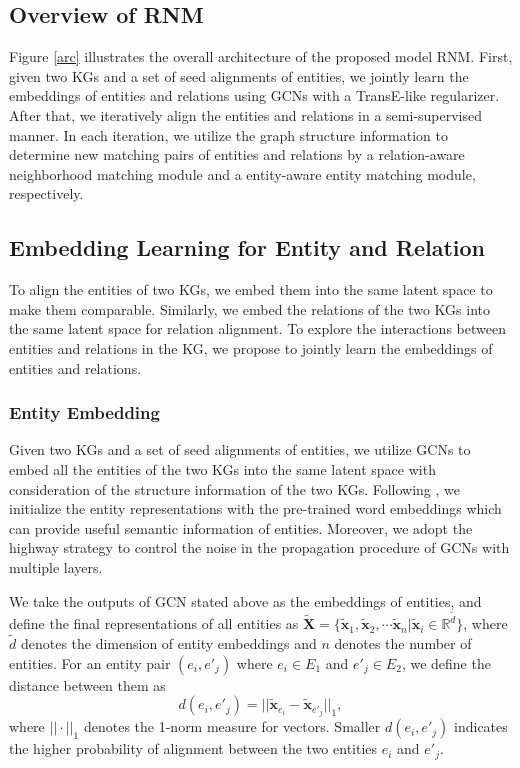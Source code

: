 \documentclass[letterpaper]{article} %
\begin{document}
\subsection{Overview of RNM}

Figure \ref{arc} illustrates the overall architecture of the
proposed model RNM. First, given two KGs and a set of seed
alignments of entities, we jointly learn the embeddings of entities
and relations using GCNs with a TransE-like regularizer. After that,
we iteratively align the entities and relations in a semi-supervised
manner. In each iteration, we utilize the graph structure
information to determine new matching pairs of entities and
relations by a relation-aware neighborhood matching module and a
entity-aware entity matching module, respectively.



\subsection{Embedding Learning for Entity and Relation}

To align the entities of two KGs, we embed them into the same
latent space to make them comparable. Similarly, we embed the
relations of the two KGs into the same latent space for relation
alignment. To explore the interactions between entities and
relations in the KG, we propose to jointly learn the embeddings of
entities and relations.


\subsubsection{Entity Embedding}
Given two KGs and a set of seed alignments of entities, we utilize
GCNs to embed all the entities of the two KGs into the same latent
space with consideration of the structure information of the two
KGs. Following \cite{xu2019cross, wu2020neighborhood}, we
initialize the entity representations with the pre-trained word
embeddings which can provide useful semantic information of
entities. Moreover, we adopt the highway
strategy \cite{srivastava2015highway} to control the noise in the propagation
procedure of GCNs with multiple layers.



We take the outputs of GCN stated above as the embeddings of
entities, and define the final representations of all entities as
$\tilde{\bm{X}} = \{ \tilde{\bm{x}}_{1}, \tilde{\bm{x}}_{2}, \cdots
\tilde{\bm{x}}_{n} | \tilde{\bm{x}}_{i} \in \mathbb{R}^{\tilde{d}}
\}$, where $\tilde{d}$ denotes the dimension of entity embeddings
and $n$ denotes the number of entities. For an entity pair
$(e_i,e'_j)$ where $e_i \in E_1$ and $e'_j \in E_2$, we define the
distance between them as
\begin{equation}
d(e_i, e'_j) = || \tilde{\bm{x}}_{e_i} - \tilde{\bm{x}}_{e'_j}
||_{1},
\end{equation}
where $|| \cdot ||_1$ denotes the 1-norm measure for vectors.
Smaller $d(e_i,e'_j)$ indicates the higher probability of alignment
between the two entities $e_i$ and $e'_j$.
\end{document}
